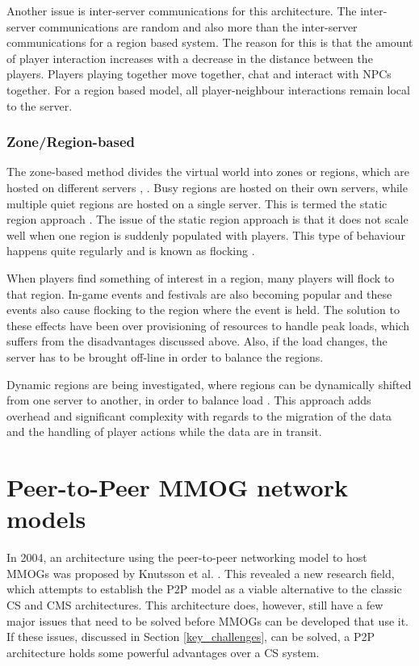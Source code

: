 \documentclass[10pt,a4paper,journal,cspaper,compsoc]{IEEEtran}
\begin{document}
Another issue is inter-server communications for this architecture. The inter-server communications are random and also more than the inter-server
communications for a region based system. The reason for this is that the amount of player interaction increases with a decrease in the distance
between the players. Players playing together move together, chat and interact with \acp{NPC} together. For a region based model, all
player-neighbour interactions remain local to the server.

\subsubsection{Zone/Region-based}
The zone-based method divides the virtual world into zones or regions, which are hosted on different servers \cite{zone_based_stat},
\cite{zone_based_dyn}. Busy regions are hosted on their own servers, while multiple quiet regions are hosted on a single server. This is termed the
static region approach \cite{zone_based_stat}. The issue of the static region approach is that it does not scale well when one region is suddenly
populated with players. This type of behaviour happens quite regularly and is known as flocking \cite{flocking}.

When players find something of interest in a region, many players will flock to that region. In-game events and festivals are also becoming popular
and these events also cause flocking to the region where the event is held. The solution to these effects have been over provisioning of resources to
handle peak loads, which suffers from the disadvantages discussed above. Also, if the load changes, the server has to be brought off-line in order to
balance the regions.

Dynamic regions are being investigated, where regions can be dynamically shifted from one server to another, in order to balance load
\cite{zone_based_dyn}. This approach adds overhead and significant complexity with regards to the migration of the data and the handling of player
actions while the data are in transit.

\section{Peer-to-Peer MMOG network models}
\label{p2p_network_models}

In 2004, an architecture using the peer-to-peer networking model to host MMOGs was proposed by Knutsson et al. \cite{knutsson_p2p_first}. This
revealed a new research field, which attempts to establish the P2P model as a viable alternative to the classic \ac{CS} and \ac{CMS} architectures.
This architecture does, however, still have a few major issues that need to be solved before MMOGs can be developed that use it. If these issues,
discussed in Section \ref{key_challenges}, can be solved, a \ac{P2P} architecture holds some powerful advantages over a \ac{CS} system.
\end{document}
